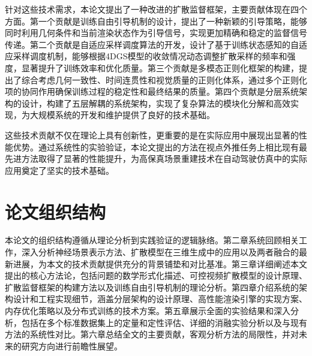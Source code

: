 针对这些技术需求，本论文提出了一种改进的扩散监督框架，主要贡献体现在四个方面。第一个贡献是训练自由引导机制的设计，提出了一种新颖的引导策略，能够同时利用几何条件和当前渲染状态作为引导信号，实现更加精确和稳定的监督信号传递。第二个贡献是自适应采样调度算法的开发，设计了基于训练状态感知的自适应采样调度机制，能够根据4DGS模型的收敛情况动态调整扩散采样的频率和强度，显著提升了训练效率和优化质量。第三个贡献是多模态正则化框架的构建，提出了综合考虑几何一致性、时间连贯性和视觉质量的正则化体系，通过多个正则化项的协同作用确保训练过程的稳定性和最终结果的质量。第四个贡献是分层系统架构的设计，构建了五层解耦的系统架构，实现了复杂算法的模块化分解和高效实现，为大规模系统的开发和维护提供了良好的技术基础。

这些技术贡献不仅在理论上具有创新性，更重要的是在实际应用中展现出显著的性能优势。通过系统性的实验验证，本论文提出的方法在视点外推任务上相比现有最先进方法取得了显著的性能提升，为高保真场景重建技术在自动驾驶仿真中的实际应用奠定了坚实的技术基础。

\section{论文组织结构}

本论文的组织结构遵循从理论分析到实践验证的逻辑脉络。第二章系统回顾相关工作，深入分析神经场景表示方法、扩散模型在三维生成中的应用以及两者融合的最新进展，为本文的技术贡献提供充分的背景铺垫和对比基准。第三章详细阐述本文提出的核心方法论，包括问题的数学形式化描述、可控视频扩散模型的设计原理、扩散监督框架的构建方法以及训练自由引导机制的理论分析。第四章介绍系统的架构设计和工程实现细节，涵盖分层架构的设计原理、高性能渲染引擎的实现方案、内存优化策略以及分布式训练的技术方案。第五章展示全面的实验结果和深入分析，包括在多个标准数据集上的定量和定性评估、详细的消融实验分析以及与现有方法的系统性对比。第六章总结全文的主要贡献，客观分析方法的局限性，并对未来的研究方向进行前瞻性展望。
